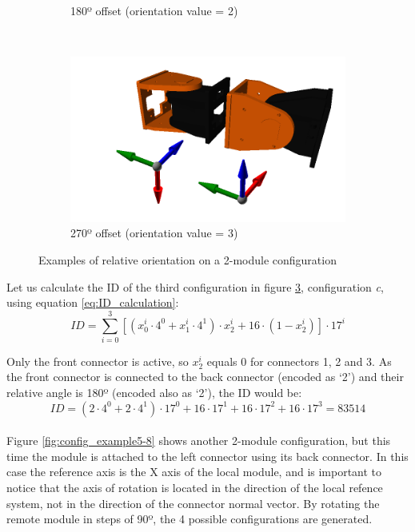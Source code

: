 \begin{figure}[h]
\begin{subfigure}[b]{0.35\textwidth}
                \caption{180º offset (orientation value = 2)}
                \label{fig:config_example3}
        \end{subfigure}
                ~
        \begin{subfigure}[b]{0.35\textwidth}
         	   \centering
                \includegraphics[width=\textwidth]{images/Conf_example_02.png}
                \caption{270º offset (orientation value = 3)}
                \label{fig:config_example4}
        \end{subfigure}
        \caption{Examples of relative orientation on a 2-module configuration}\label{fig:config_example1-4}
\end{figure}
Let us calculate the ID of the third configuration in figure \ref{fig:config_example1-4}, configuration \emph{c}, using equation \ref{eq:ID_calculation}:
\[ID = \sum_{i=0}^{3}{ [( x_0^i \cdot 4^0+ x_1^i \cdot 4^1) \cdot x_2^i + 16 \cdot (1-x_2^i)] \cdot 17^i}\]

Only the front connector is active, so $x_2^i$ equals 0 for connectors 1, 2 and 3. As the front connector is connected to the back connector (encoded as `2') and their relative angle is 180º (encoded also as `2'), the ID would be:
\[ID = ( 2 \cdot 4^0+ 2 \cdot 4^1) \cdot 17^0 +
  16 \cdot 17^1 + 16 \cdot 17^2 + 16  \cdot 17^3 = 83514\]\\
  

Figure \ref{fig:config_example5-8} shows another 2-module configuration, but this time the module is attached to the left connector using its back connector. In this case the reference axis is the X axis of the local module, and is important to notice that the axis of rotation is located in the direction of the local refence system, not in the direction of the connector normal vector. By rotating the remote module in steps of 90º, the 4 possible configurations are generated.\\

